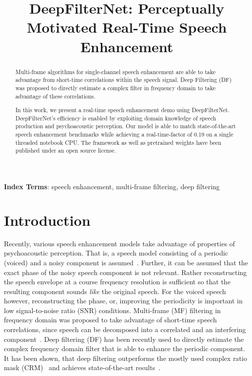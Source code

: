 \documentclass{INTERSPEECH2023}
\title{DeepFilterNet: Perceptually Motivated Real-Time Speech Enhancement}
\begin{document}
\maketitle
 
\begin{abstract}
  \vspace{-.2em}
  Multi-frame algorithms for single-channel speech enhancement are able to take advantage from short-time correlations within the speech signal.
  Deep Filtering (DF) was proposed to directly estimate a complex filter in frequency domain to take advantage of these correlations.

  In this work, we present a real-time speech enhancement demo using DeepFilterNet.
  DeepFilterNet's efficiency is enabled by exploiting domain knowledge of speech production and psychoacoustic perception.
  Our model is able to match state-of-the-art speech enhancement benchmarks while achieving a real-time-factor of 0.19 on a single threaded notebook CPU.
  The framework as well as pretrained weights have been published under an open source license.
\end{abstract}
\noindent\textbf{Index Terms}: speech enhancement, multi-frame filtering, deep filtering
\vspace{-1em}

\section{Introduction}
\vspace{-.2em}
Recently, various speech enhancement models take advantage of properties of psychoacoustic perception.
That is, a speech model consisting of a periodic (voiced) and a noisy component is assumed~\cite{valin2018rnnoise, valin2020perceptually, schroeter2022deepfilternet}.
Further, it can be assumed that the exact phase of the noisy speech component is not relevant. Rather reconstructing the speech envelope at a course frequency resolution is sufficient so that the resulting component sounds \textit{like} the original speech.
For the voiced speech however, reconstructing the phase, or, improving the periodicity is important in low signal-to-noise ratio (SNR) conditions.
Multi-frame (MF) filtering in frequency domain was proposed to take advantage of short-time speech correlations, since speech can be decomposed into a correlated and an interfering component~\cite{huang2011multi}.
Deep filtering (DF) \cite{schroeter2020clcnet, mack2019deep} has been recently used to directly estimate the complex frequency domain filter that is able to enhance the periodic component.
It has been shown, that deep filtering outperforms the mostly used complex ratio mask (CRM)~\cite{schroeter2022deepfilternet} and achieves state-of-the-art results~\cite{schroeter2022deepfilternet2}.
\end{document}
